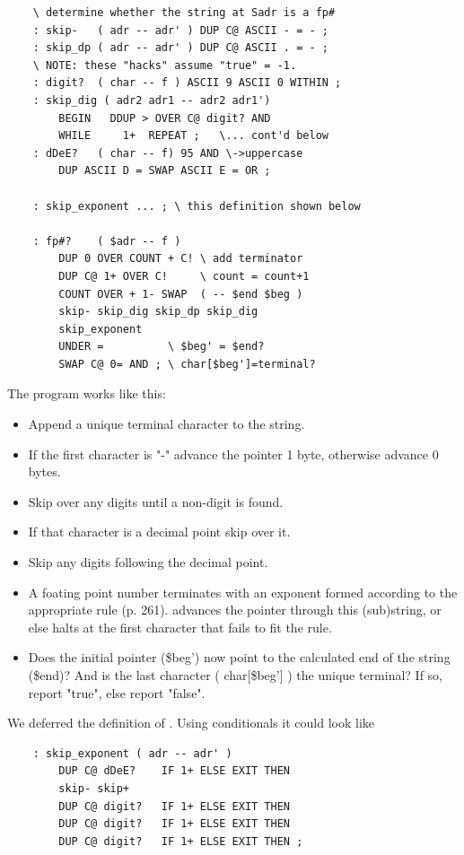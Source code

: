 \begin{lstlisting}
    \ determine whether the string at Sadr is a fp#
    : skip-   ( adr -- adr' ) DUP C@ ASCII - = - ;
    : skip_dp ( adr -- adr' ) DUP C@ ASCII . = - ;
    \ NOTE: these "hacks" assume "true" = -1.
    : digit?  ( char -- f ) ASCII 9 ASCII 0 WITHIN ;
    : skip_dig ( adr2 adr1 -- adr2 adr1')
        BEGIN   DDUP > OVER C@ digit? AND
        WHILE     1+  REPEAT ;   \... cont'd below
    : dDeE?   ( char -- f) 95 AND \->uppercase
        DUP ASCII D = SWAP ASCII E = OR ;

    : skip_exponent ... ; \ this definition shown below

    : fp#?    ( $adr -- f )
        DUP 0 OVER COUNT + C! \ add terminator
        DUP C@ 1+ OVER C!     \ count = count+1
        COUNT OVER + 1- SWAP  ( -- $end $beg )
        skip- skip_dig skip_dp skip_dig
        skip_exponent
        UNDER =          \ $beg' = $end?
        SWAP C@ 0= AND ; \ char[$beg']=terminal?
\end{lstlisting}

The program works like this:

\begin{itemize}
    \item Append a unique terminal character to the string.
    \item If the first character is "-" advance the pointer 1 byte, otherwise advance 0 bytes.
    \item Skip over any digits until a non-digit is found.
    \item If that character is a decimal point skip over it.
    \item Skip any digits following the decimal point.
    \item A foating point number terminates with an exponent formed according to the appropriate rule (p. 261).  advances the pointer through this (sub)string, or else halts at the first character that fails to fit the rule.
    \item Does the initial pointer (\$beg') now point to the calculated end of the string (\$end)? And is the last character ( char[\$beg'] ) the unique terminal? If so, report "true", else report "false".
\end{itemize}

We deferred the definition of . Using conditionals it could look like

\begin{lstlisting}
    : skip_exponent ( adr -- adr' )
        DUP C@ dDeE?    IF 1+ ELSE EXIT THEN
        skip- skip+
        DUP C@ digit?   IF 1+ ELSE EXIT THEN
        DUP C@ digit?   IF 1+ ELSE EXIT THEN
        DUP C@ digit?   IF 1+ ELSE EXIT THEN ;
\end{lstlisting}

